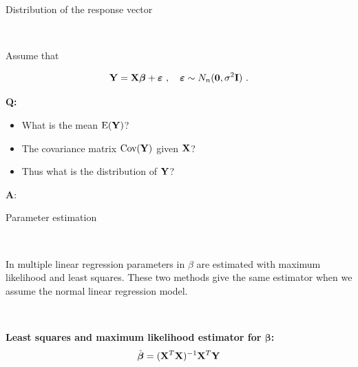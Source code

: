 \documentclass[10pt,ignorenonframetext,]{beamer}
\begin{document}
\begin{frame}

\begin{block}{Distribution of the response vector}

\(~\)

Assume that

\[{\bf Y=X \boldsymbol\beta}+{\boldsymbol \varepsilon} \ , \quad \boldsymbol\varepsilon\sim N_n({\bf 0},\sigma^2 {\bf I}) \ . \]

\vspace{4mm}

\textbf{Q:}

\begin{itemize}
\item
  What is the mean \(\text{E}(\bf Y)\)?
\item
  The covariance matrix \(\text{Cov}(\bf Y)\) given \(\bf{X}\)?
\item
  Thus what is the distribution of \(\bf Y\)?
\end{itemize}

\end{block}

\end{frame}

\begin{frame}

\textbf{A}:

\end{frame}

\begin{frame}

\begin{block}{Parameter estimation}

\(~\)

In multiple linear regression parameters in \(\beta\) are estimated with
maximum likelihood and least squares. These two methods give the same
estimator when we assume the normal linear regression model.

\(~\)

\textbf{Least squares and maximum likelihood estimator for
\({\boldsymbol \beta}\):}
\[ \hat{\boldsymbol\beta}=({\bf X}^T{\bf X})^{-1} {\bf X}^T {\bf Y}\]

\end{block}

\end{frame}
\end{document}
